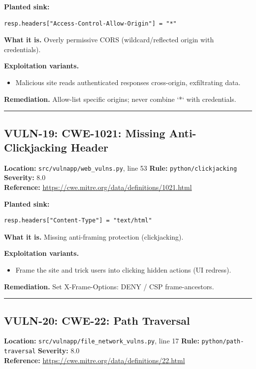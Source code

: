 \documentclass[11pt,a4paper]{article}
\begin{document}
\noindent\textbf{Planted sink:}
\begin{lstlisting}
resp.headers["Access-Control-Allow-Origin"] = "*"
\end{lstlisting}
\noindent\textbf{What it is.} Overly permissive CORS (wildcard/reflected origin with credentials).

\noindent\textbf{Exploitation variants.}
\begin{itemize}[leftmargin=1.4em,itemsep=1pt,topsep=2pt]
\item Malicious site reads authenticated responses cross-origin, exfiltrating data.
\end{itemize}
\noindent\textbf{Remediation.} Allow-list specific origins; never combine `*` with credentials.

\vspace{4pt}\hrule\vspace{6pt}
\subsection{VULN-19: CWE-1021: Missing Anti-Clickjacking Header}
\noindent\textbf{Location:} \texttt{src/vulnapp/web\_vulns.py}, line 53 \quad \textbf{Rule:} \texttt{python/clickjacking} \quad \textbf{Severity:} 8.0
\\ \textbf{Reference:} \url{https://cwe.mitre.org/data/definitions/1021.html}

\noindent\textbf{Planted sink:}
\begin{lstlisting}
resp.headers["Content-Type"] = "text/html"
\end{lstlisting}
\noindent\textbf{What it is.} Missing anti-framing protection (clickjacking).

\noindent\textbf{Exploitation variants.}
\begin{itemize}[leftmargin=1.4em,itemsep=1pt,topsep=2pt]
\item Frame the site and trick users into clicking hidden actions (UI redress).
\end{itemize}
\noindent\textbf{Remediation.} Set X-Frame-Options: DENY / CSP frame-ancestors.

\vspace{4pt}\hrule\vspace{6pt}
\subsection{VULN-20: CWE-22: Path Traversal}
\noindent\textbf{Location:} \texttt{src/vulnapp/file\_network\_vulns.py}, line 17 \quad \textbf{Rule:} \texttt{python/path-traversal} \quad \textbf{Severity:} 8.0
\\ \textbf{Reference:} \url{https://cwe.mitre.org/data/definitions/22.html}
\end{document}
